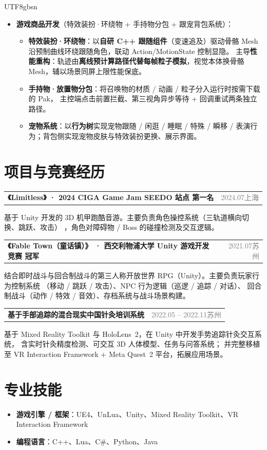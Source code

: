 \documentclass[a4paper, 10.5pt]{article}
\makeatletter
\newcommand{\entryheadsingle}[2]{%
  \noindent
  \begin{tabularx}{\linewidth}{@{}X r@{}}
    \textbf{#1} & \small\textcolor{gray}{#2}
  \end{tabularx}\vspace{1pt}}
\makeatother
\begin{document}
\begin{CJK}{UTF8}{gbsn}
\begin{itemize}
  \item \textbf{游戏商品开发}（特效装扮·环绕物 + 手持物分包 + 跟宠背包系统）：
        \begin{itemize}[leftmargin=1.4em, topsep=1pt, label=$\circ$]
          \item \textbf{特效装扮·环绕物}：以\textbf{自研 C++ 跟随组件}（变速追及）驱动骨骼 Mesh 沿预制曲线环绕跟随角色，联动 Action/MotionState 控制显隐。
          主导\textbf{性能重构}：轨迹由\textbf{离线预计算路径代替每帧粒子模拟}，视觉本体换骨骼 Mesh，辅以场景同屏上限性能保底。
          \item \textbf{手持物·放置物分包}：将召唤物的材质 / 动画 / 粒子分入运行时按需下载的 Pak，
                主控端点击前置拦截、第三视角异步等待 + 回调重试两条独立路径。
          \item \textbf{宠物系统}：以\textbf{行为树}实现宠物跟随 / 闲逛 / 睡眠 / 特殊 / 瞬移 / 表演行为；背包侧实现宠物皮肤与特效装扮更换、展示界面。
        \end{itemize}
\end{itemize}

\section{项目与竞赛经历}

\entryheadsingle{《Limitless》 · 2024 CIGA Game Jam SEEDO 站点 \textbf{第一名}}{2024.07\quad 上海}

基于 Unity 开发的 3D 机甲跑酷音游。主要负责角色操控系统（三轨道横向切换、跳跃、攻击）
，角色对障碍物 / Boss 的碰撞检测及交互逻辑。

\vspace{3pt}

\entryheadsingle{《Fable Town（童话镇）》 · 西交利物浦大学 Unity 游戏开发竞赛 \textbf{冠军}}{2021.07\quad 苏州}

结合即时战斗与回合制战斗的第三人称开放世界 RPG（Unity）。主要负责玩家行为控制系统
（移动 / 跳跃 / 攻击）、NPC 行为逻辑（巡逻 / 追踪 / 对话）、
回合制战斗（动作 / 特效 / 音效）、存档系统与战斗场景构建。

\vspace{3pt}

\entryheadsingle{基于手部追踪的混合现实中国针灸培训系统}{2022.05 -- 2022.11\quad 苏州}

基于 Mixed Reality Toolkit 与 HoloLens~2，在 Unity 中开发手势追踪针灸交互系统，
含实时针灸精度检测、可交互 3D 人体模型、任务与问答系统；
并完整移植至 VR Interaction Framework + Meta Quest~2 平台，拓展应用场景。

\section{专业技能}

\begin{itemize}
  \item \textbf{游戏引擎 / 框架}：UE4、UnLua、Unity、Mixed Reality Toolkit、VR Interaction Framework
  \item \textbf{编程语言}：C++、Lua、C\#、Python、Java
\end{itemize}

\end{CJK}
\end{document}
